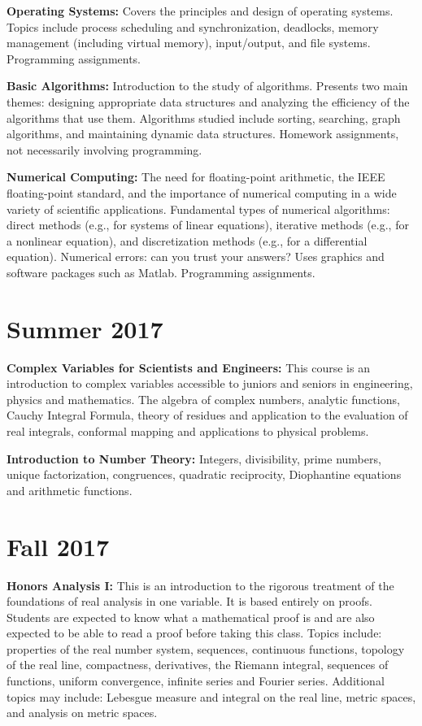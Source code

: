 \documentclass[11pt]{article}
\begin{document}
{\bf Operating Systems:} Covers the principles and design of operating systems.
Topics include process scheduling and synchronization, deadlocks, memory
management (including virtual memory), input/output, and file systems.
Programming assignments.

{\bf Basic Algorithms:} Introduction to the study of algorithms. Presents two
main themes: designing appropriate data structures and analyzing the efficiency
of the algorithms that use them. Algorithms studied include sorting, searching,
graph algorithms, and maintaining dynamic data structures. Homework assignments,
not necessarily involving programming.

{\bf Numerical Computing:} The need for floating-point arithmetic, the IEEE
floating-point standard, and the importance of numerical computing in a wide
variety of scientific applications. Fundamental types of numerical algorithms:
direct methods (e.g., for systems of linear equations), iterative methods (e.g.,
for a nonlinear equation), and discretization methods (e.g., for a differential
equation). Numerical errors: can you trust your answers? Uses graphics and
software packages such as Matlab. Programming assignments.

\section*{Summer 2017}

{\bf Complex Variables for Scientists and Engineers:} This course is an
introduction to complex variables accessible to juniors and seniors in
engineering, physics and mathematics. The algebra of complex numbers, analytic
functions, Cauchy Integral Formula, theory of residues and application to the
evaluation of real integrals, conformal mapping and applications to physical
problems.

{\bf Introduction to Number Theory:} Integers, divisibility, prime numbers,
unique factorization, congruences, quadratic reciprocity, Diophantine equations
and arithmetic functions.

\section*{Fall 2017}

{\bf Honors Analysis I:} This is an introduction to the rigorous treatment of
the foundations of real analysis in one variable. It is based entirely on
proofs. Students are expected to know what a mathematical proof is and are also
expected to be able to read a proof before taking this class. Topics include:
properties of the real number system, sequences, continuous functions, topology
of the real line, compactness, derivatives, the Riemann integral, sequences of
functions, uniform convergence, infinite series and Fourier series. Additional
topics may include: Lebesgue measure and integral on the real line, metric
spaces, and analysis on metric spaces.
\end{document}
